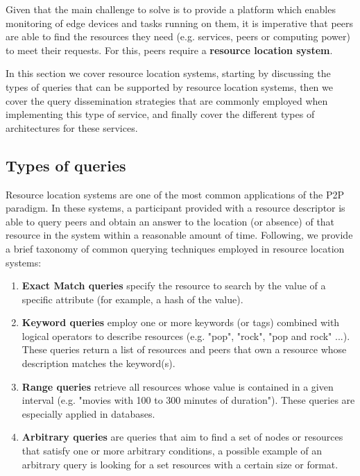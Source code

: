 

Given that the main challenge to solve is to provide a platform which enables monitoring of edge devices and tasks running on them, it is imperative that peers are able to find the resources they need (e.g. services, peers or computing power) to meet their requests. For this, peers require a \textbf{resource location system}.

In this section we cover resource location systems, starting by discussing the types of queries that can be supported by resource location systems, then we cover the query dissemination strategies that are commonly employed when implementing this type of service, and finally cover the different types of architectures for these services.

\subsection{Types of queries}

Resource location systems are one of the most common applications of the P2P paradigm. In these systems, a participant provided with a resource descriptor is able to query peers and obtain an answer to the location (or absence) of that resource in the system within a reasonable amount of time. Following, we provide a brief taxonomy of common querying techniques employed in resource location systems:

\begin{enumerate}
    \item \textbf{Exact Match queries} specify the resource to search by the value of a specific attribute (for example, a hash of the value).

    \item \textbf{Keyword queries} employ one or more keywords (or tags) combined with logical operators to describe resources (e.g. "pop", "rock", "pop and rock" ...). These queries return a list of resources and peers that own a resource whose description matches the keyword(s).
    
    \item \textbf{Range queries} retrieve all resources whose value is contained in a given interval (e.g. "movies with 100 to 300 minutes of duration"). These queries are especially applied in databases.
    
    \item \textbf{Arbitrary queries} are queries that aim to find a set of nodes or resources that satisfy one or more arbitrary conditions, a possible example of an arbitrary query is looking for a set resources with a certain size or format.
    
\end{enumerate}


